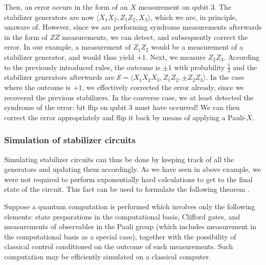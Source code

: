 Then, an error occurs in the form of an $X$ measurement on qubit 3. The
stabilizer generators are now $\langle X_1X_2, Z_1Z_2, X_3\rangle$, which we
are, in principle, unaware of. However,
since we are performing syndrome measurements afterwards in the form of $ZZ$
measurements, we can detect, and subsequently correct the error. In our
example, a measurement of $Z_1Z_2$ would be a measurement of a stabilizer
generator, and would thus yield $+1$. Next, we measure $Z_2Z_3$. According to
the previously introduced rules, the outcome is $\pm 1$ with probability
$\frac{1}{2}$ and the stabilizer generators afterwards are $\mathcal{S} =
\langle X_1X_2X_3, Z_1Z_2, \pm Z_2Z_3\rangle$. In the case where the outcome is
$+1$, we effectively corrected the error already, since we recovered the
previous stabilizers. In the converse case, we at least detected the syndrome
of the error: bit flip on qubit $3$ must have occurred! We can then correct the
error appropriately and flip it back by means of applying a Pauli-$X$.
\clearpage
\subsubsection{Simulation of stabilizer circuits}
Simulating stabilizer circuits can thus be done by keeping track of all the
generators and updating them accordingly. As we have seen in above example, we
were not required to perform exponentially hard calculations to get to the
final state of the circuit. This fact can be used to formulate the following
theorem \cite{gottesmanHeisenbergRepresentationQuantum1998}.
\begin{thm}\label{thm:gottesman-knill}
  Suppose a quantum computation is performed which involves only the following
  elements: state preparations in the computational basis, Clifford gates, and
  measurements of observables in the Pauli group (which includes measurement in
  the computational basis as a special case), together with the possibility of
  classical control conditioned on the outcome of such measurements. Such
  computation may be efficiently simulated on a classical computer.
\end{thm}

